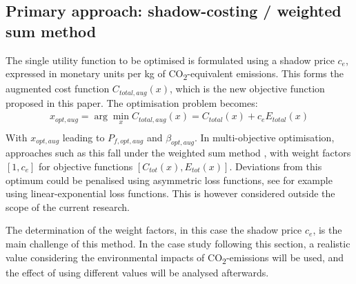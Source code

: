 
\subsection{Primary approach: shadow-costing / weighted sum method}
The single utility function to be optimised is formulated using a shadow price $c_e$, expressed in monetary units per kg of CO\textsubscript{2}-equivalent emissions.
This forms the augmented cost function $C_{total,aug}(x)$, which is the new objective function proposed in this paper.
The optimisation problem becomes:
\begin{equation}
    \begin{aligned}
        x_{opt,aug} =\arg \min_{x} C_{total,aug}(x) = C_{total}(x) + c_e E_{total}(x) \\
    \end{aligned}
\end{equation}
With $x_{opt,aug}$ leading to $P_{f,opt,aug}$ and $\beta_{opt,aug}$.
In multi-objective optimisation, approaches such as this fall under the weighted sum method \citep{Deb2001Multi-objectiveAlgorithms}, with weight factors $[1,c_e]$ for objective functions $[C_{tot}(x), E_{tot}(x)]$.
Deviations from this optimum could be penalised using asymmetric loss functions, see for example \citep{vanGelder2000StatisticalStructures} using linear-exponential loss functions.
This is however considered outside the scope of the current research.

The determination of the weight factors, in this case the shadow price $c_e$, is the main challenge of this method.
In the case study following this section, a realistic value considering the environmental impacts of CO\textsubscript{2}-emissions will be used, and the effect of using different values will be analysed afterwards.

